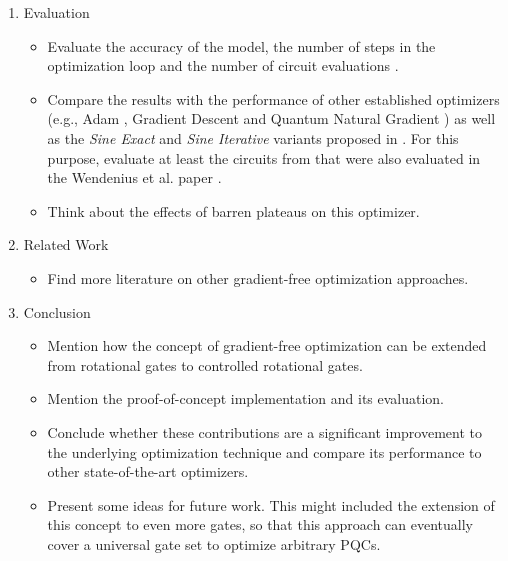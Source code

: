\begin{enumerate}
    \item Evaluation
    \begin{itemize}
        \item
            Evaluate the accuracy of the model, the number of steps in the
            optimization loop and the number of circuit evaluations
            \cite{wendenius_gradient-free_2023,ostaszewski_structure_2021}.
        \item
            Compare the results with the performance of other established
            optimizers (e.g., Adam \cite{kingma_adam_2017}, Gradient Descent and
            Quantum Natural Gradient \cite{stokes_quantum_2020}) as well as the
            \emph{Sine Exact} and \emph{Sine Iterative} variants proposed in
            \cite{wendenius_gradient-free_2023}.
            For this purpose, evaluate at least the circuits from
            \cite{sim_expressibility_2019} that were also evaluated in the
            Wendenius et al. paper \cite{wendenius_gradient-free_2023}.
        \item
            Think about the effects of barren plateaus on this optimizer.
    \end{itemize}

    \item Related Work
    \begin{itemize}
        \item
            Find more literature on other gradient-free optimization
            approaches.
    \end{itemize}

    \item Conclusion
    \begin{itemize}
        \item
            Mention how the concept of gradient-free optimization can be
            extended from rotational gates to controlled rotational gates.
        \item
            Mention the proof-of-concept implementation and its evaluation.
        \item
            Conclude whether these contributions are a
            significant improvement to the underlying optimization technique
            and compare its performance to other state-of-the-art optimizers.
        \item
            Present some ideas for future work.
            This might included the extension of this concept to even more
            gates, so that this approach can eventually cover a universal gate
            set to optimize arbitrary PQCs.
    \end{itemize}


\end{enumerate}
